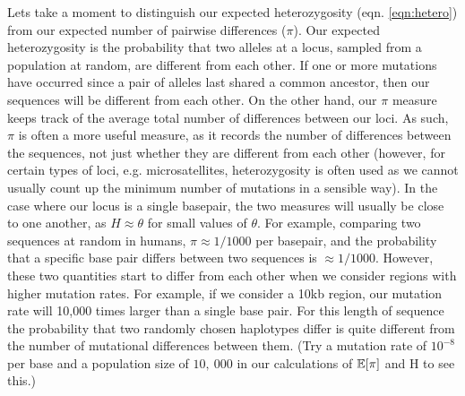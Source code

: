 Lets take a moment to distinguish our expected heterozygosity (eqn. \ref{eqn:hetero}) from our expected number of pairwise differences ($\pi$). Our expected heterozygosity is the probability that two alleles at a locus, sampled from a population at random, are different from each other. If one or more mutations have occurred since a pair of alleles last shared a common ancestor, then our sequences will be different from each other. On the other hand, our $\pi$ measure keeps track of the average total number of differences between our loci. As such, $\pi$ is often a more useful measure, as it records the number of differences between the sequences, not just whether they are different from each other (however, for certain types of loci, e.g. microsatellites, heterozygosity is often used as we cannot usually count up the minimum number of mutations in a sensible way). In the case where our locus is a single basepair, the two measures will usually be close to one another, as $H \approx \theta$ for small values of $\theta$. For example, comparing two sequences at random in humans, $\pi \approx 1/1000$ per basepair, and the probability that a specific base pair differs between two sequences is $\approx 1/1000$. However, these two quantities start to differ from each other when we consider regions with higher mutation rates. For example, if we consider a 10kb region, our mutation rate will 10,000 times larger than a single base pair. For this length of sequence the probability that two randomly chosen haplotypes differ is quite different from the number of mutational differences  between them. (Try a mutation rate of $10^{-8}$ per base and a population size of $10,~000$ in our calculations of $\mathbb{E}[\pi]$ and H to see this.)


